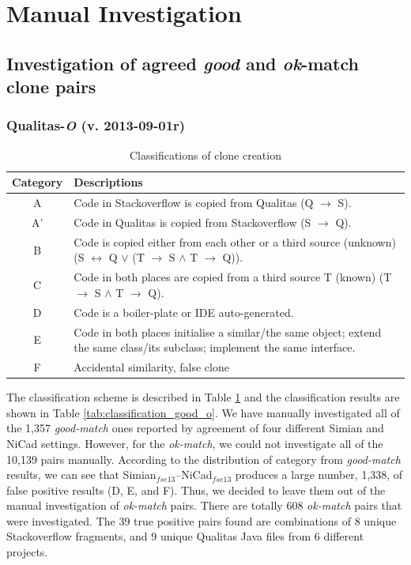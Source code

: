 \documentclass{IEEEtran}
\begin{document}
\section*{Manual Investigation}

\subsection{Investigation of agreed \textit{good} and \textit{ok}-match clone pairs}

\subsubsection{Qualitas-\textit{O} (v. 2013-09-01r)}

\begin{table}[H]
	\centering
	\caption{Classifications of clone creation}
	\label{tab:classification_scheme}
	\begin{tabular}{|c|p{13cm}|}
		\hline 
		Category & Descriptions \\ 
		\hline 
		A & Code in Stackoverflow is copied from Qualitas (Q $\rightarrow$ S). \\ 
		\hline 
		A' & Code in Qualitas is copied from Stackoverflow (S $\rightarrow$ Q). \\ 
		\hline 
		B & Code is copied either from each other or a third source (unknown) (S $\leftrightarrow$ Q $\vee$ (T $\rightarrow$ S $\wedge$ T $\rightarrow$ Q)).
		\\ 
		\hline 
		C & Code in both places are copied from a third source T (known) (T $\rightarrow$ S $\wedge$ T $\rightarrow$ Q).
		\\ 
		\hline 
		D & Code is a boiler-plate or IDE auto-generated.
		\\ 
		\hline 
		E & Code in both places initialise a similar/the same object; extend the same class/its subclass; implement the same interface.
		\\ 
		\hline 
		F & Accidental similarity, false clone \\ 
		\hline 
	\end{tabular} 
\end{table}

The classification scheme is described in Table \ref{tab:classification_scheme} and the classification results are shown in Table \ref{tab:classification_good_o}. We have manually investigated all of the 1,357 \textit{good-match} ones reported by agreement of four different Simian and NiCad settings.  However, for the \textit{ok-match}, we could not investigate all of the 10,139 pairs manually.  According to the distribution of category from \textit{good-match} results, we can see that Simian$_{fse13}$--NiCad$_{fse13}$ produces a large number, 1,338, of false positive results (D, E, and F). Thus, we decided to leave them out of the manual investigation of \textit{ok-match} pairs. There are totally 608 \textit{ok-match} pairs that were investigated. The 39 true positive pairs found are combinations of 8 unique Stackoverflow fragments, and 9 unique Qualitas Java files from 6 different projects.
\end{document}
